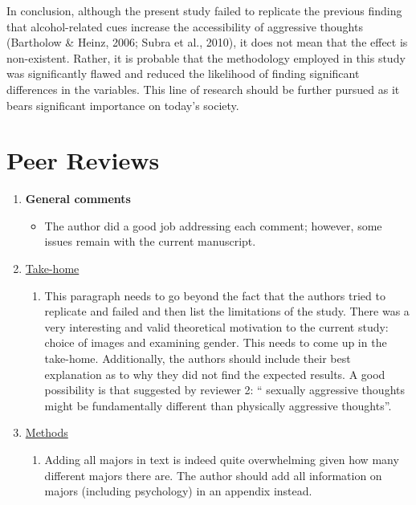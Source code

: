 \documentclass[authordate, serif, review]{jote-article}
\begin{document}
\begin{multicols}{2}
In conclusion, although the present study failed to replicate the previous finding that alcohol-related cues increase the accessibility of aggressive thoughts (Bartholow \& Heinz, 2006; Subra et al., 2010), it does not mean that the effect is non-existent. Rather, it is probable that the methodology employed in this study was significantly flawed and reduced the likelihood of finding significant differences in the variables. This line of research should be further pursued as it bears significant importance on today's society.



\newpage

{}
\section*{Peer Reviews}
\label{sec:reviews}

\noindent \begin{reviewend}{}
    \begin{enumerate}[label=\textbf{\arabic*}), start=0]
    \item \textbf{General comments}
        \begin{itemize}
            \item The author did a good job addressing each comment; however, some issues remain with the current manuscript. 
        \end{itemize}

    \item \hyperref[sec:take-home]{Take-home}
        \begin{enumerate}
            \item This paragraph needs to go beyond the fact that the authors tried to replicate and failed and then list the limitations of the study. There was a very interesting and valid theoretical motivation to the current study: choice of images and examining gender. This needs to come up in the take-home. Additionally, the authors should include their best explanation as to why they did not find the expected results. A good possibility is that suggested by reviewer 2: `` sexually aggressive thoughts might be fundamentally different than physically aggressive thoughts''. 
        \end{enumerate}


    \item \hyperref[sec:methods]{Methods}
        \begin{enumerate}
            \item Adding all majors in text is indeed quite overwhelming given how many different majors there are. The author should add all information on majors (including psychology) in an appendix instead. 


\end{enumerate}
\end{enumerate}
\end{reviewend}
\end{multicols}
\end{document}
